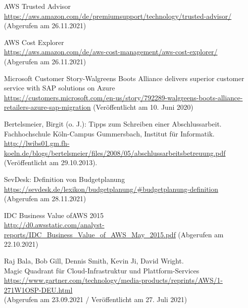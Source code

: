 \begin{thebibliography}{HR08}
    AWS Trusted Advisor\\
  \url{https://aws.amazon.com/de/premiumsupport/technology/trusted-advisor/}\\
  (Abgerufen am 26.11.2021)

   AWS Cost Explorer\\
  \url{https://aws.amazon.com/de/aws-cost-management/aws-cost-explorer/}\\
  (Abgerufen am 26.11.2021)


  
   Microsoft Customer Story-Walgreens Boots Alliance delivers superior customer service with SAP solutions on Azure \\
  \url{https://customers.microsoft.com/en-us/story/792289-walgreens-boots-alliance-retailers-azure-sap-migration}
  (Veröffentlicht am 10. Juni 2020)

  Bertelsmeier, Birgit (o. J.): Tipps zum Schrei\-b\-en ei\-n\-er Ab\-sch\-luss\-ar\-beit. Fach\-hoch\-schu\-le Köln-Campus Gummersbach, Institut für Informatik. \\
  \url{http://lwibs01.gm.fh-koeln.de/blogs/bertelsmeier/files/2008/05/abschlussarbeitsbetreuung.pdf} (Veröffentlicht am 29.10.2013).

  SevDesk: Definition von Budgetplanung\\
  \url{https://sevdesk.de/lexikon/budgetplanung/#budgetplanung-definition}\\
  (Abgerufen am 28.11.2021)


   IDC Business Value ofAWS 2015\\
 \url{http://d0.awsstatic.com/analyst-reports/IDC_Business_Value_of_AWS_May_2015.pdf}
 (Abgerufen am 22.10.2021)

  Raj Bala, Bob Gill, Dennis Smith, Kevin Ji, David Wright.\\ 
  Magic Quadrant für Cloud-Infrastruktur und Plattform-Services \\
  \url{https://www.gartner.com/technology/media-products/reprints/AWS/1-271W1OSP-DEU.html}
  \\(Abgerufen am 23.09.2021 / Veröffentlicht am 27. Juli 2021)


\end{thebibliography}
